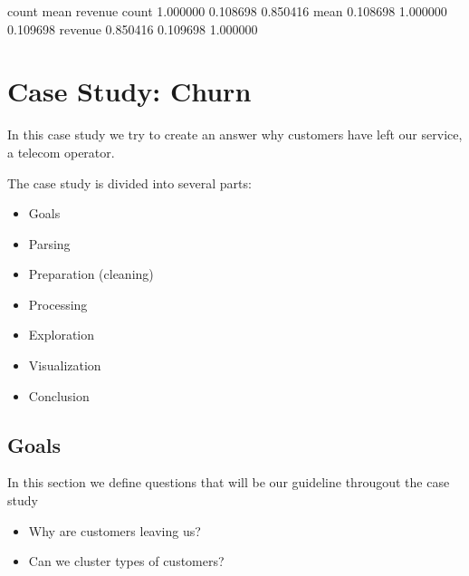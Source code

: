 \documentclass[letterpaper,10pt,english]{jupyterBook}
\begin{document}
\begin{sphinxVerbatim}[commandchars=\\\{\}]
\end{sphinxVerbatim}

\begin{sphinxVerbatim}[commandchars=\\\{\}]
            count      mean   revenue
count    1.000000 \PYGZhy{}0.108698  0.850416
mean    \PYGZhy{}0.108698  1.000000 \PYGZhy{}0.109698
revenue  0.850416 \PYGZhy{}0.109698  1.000000
\end{sphinxVerbatim}


\chapter{Case Study: Churn}
\label{\detokenize{c7_case_studies/Churn:case-study-churn}}\label{\detokenize{c7_case_studies/Churn::doc}}
\sphinxAtStartPar
In this case study we try to create an answer why customers have left our service, a telecom operator.

\sphinxAtStartPar
The case study is divided into several parts:
\begin{itemize}
\item {} 
\sphinxAtStartPar
Goals

\item {} 
\sphinxAtStartPar
Parsing

\item {} 
\sphinxAtStartPar
Preparation (cleaning)

\item {} 
\sphinxAtStartPar
Processing

\item {} 
\sphinxAtStartPar
Exploration

\item {} 
\sphinxAtStartPar
Visualization

\item {} 
\sphinxAtStartPar
Conclusion

\end{itemize}


\section{Goals}
\label{\detokenize{c7_case_studies/Churn:goals}}
\sphinxAtStartPar
In this section we define questions that will be our guideline througout the case study
\begin{itemize}
\item {} 
\sphinxAtStartPar
Why are customers leaving us?

\item {} 
\sphinxAtStartPar
Can we cluster types of customers?

\end{itemize}
\end{document}
